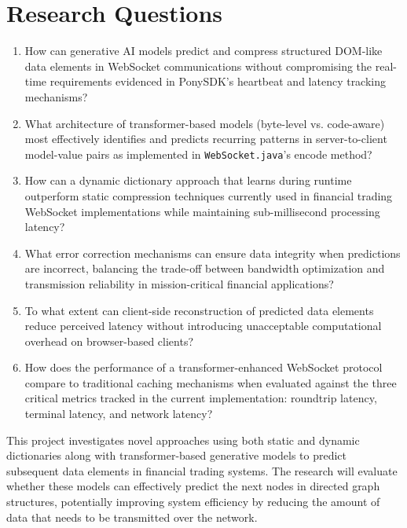 \documentclass[a4paper, 11pt, twoside, openright]{report}
\begin{document}
\section{Research Questions}

\begin{enumerate}[label=\textbf{RQ\arabic*:}, leftmargin=*]
    \item How can generative AI models predict and compress structured DOM-like data elements in WebSocket communications without compromising the real-time requirements evidenced in PonySDK’s heartbeat and latency tracking mechanisms?
    \item What architecture of transformer-based models (byte-level vs. code-aware) most effectively identifies and predicts recurring patterns in server-to-client model-value pairs as implemented in \texttt{WebSocket.java}'s encode method?
    \item How can a dynamic dictionary approach that learns during runtime outperform static compression techniques currently used in financial trading WebSocket implementations while maintaining sub-millisecond processing latency?
    \item What error correction mechanisms can ensure data integrity when predictions are incorrect, balancing the trade-off between bandwidth optimization and transmission reliability in mission-critical financial applications?
    \item To what extent can client-side reconstruction of predicted data elements reduce perceived latency without introducing unacceptable computational overhead on browser-based clients?
    \item How does the performance of a transformer-enhanced WebSocket protocol compare to traditional caching mechanisms when evaluated against the three critical metrics tracked in the current implementation: roundtrip latency, terminal latency, and network latency?
\end{enumerate}




\bigskip
\noindent
This project investigates novel approaches using both static and dynamic dictionaries along with transformer-based generative models to predict subsequent data elements in financial trading systems. The research will evaluate whether these models can effectively predict the next nodes in directed graph structures, potentially improving system efficiency by reducing the amount of data that needs to be transmitted over the network.
\bigskip
\end{document}
